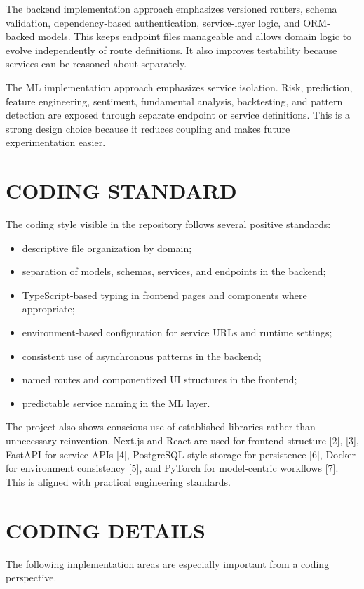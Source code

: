 \documentclass[12pt,a4paper]{report}
\begin{document}
The backend implementation approach emphasizes versioned routers, schema validation, dependency-based authentication, service-layer logic, and ORM-backed models. This keeps endpoint files manageable and allows domain logic to evolve independently of route definitions. It also improves testability because services can be reasoned about separately.

The ML implementation approach emphasizes service isolation. Risk, prediction, feature engineering, sentiment, fundamental analysis, backtesting, and pattern detection are exposed through separate endpoint or service definitions. This is a strong design choice because it reduces coupling and makes future experimentation easier.

\section{CODING STANDARD}
The coding style visible in the repository follows several positive standards:
\begin{itemize}
\item descriptive file organization by domain;
\item separation of models, schemas, services, and endpoints in the backend;
\item TypeScript-based typing in frontend pages and components where appropriate;
\item environment-based configuration for service URLs and runtime settings;
\item consistent use of asynchronous patterns in the backend;
\item named routes and componentized UI structures in the frontend;
\item predictable service naming in the ML layer.
\end{itemize}

The project also shows conscious use of established libraries rather than unnecessary reinvention. Next.js and React are used for frontend structure [2], [3], FastAPI for service APIs [4], PostgreSQL-style storage for persistence [6], Docker for environment consistency [5], and PyTorch for model-centric workflows [7]. This is aligned with practical engineering standards.

\section{CODING DETAILS}
The following implementation areas are especially important from a coding perspective.
\end{document}
